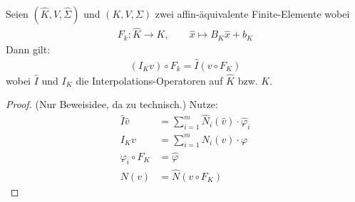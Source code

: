 \begin{lemma}\label{lemma4.13}
	Seien $(\hat{K},\hat{V},\hat{\Sigma})$ und $(K,V,\Sigma)$ zwei affin-äquivalente Finite-Elemente wobei
	\begin{align*}
		F_k:\hat{K}\to K,\qquad\hat{x}\mapsto B_K\hat{x}+b_K
	\end{align*}
	Dann gilt:
	\begin{align*}
		(I_K v)\circ F_k=\hat{I}(v\circ F_K)
	\end{align*}
	wobei $\hat{I}$ und $I_K$ die Interpolations-Operatoren auf $\hat{K}$ bzw. $K$.
\end{lemma}

\begin{proof}
	(Nur Beweisidee, da zu technisch.)
	Nutze:
	\begin{align*}
		\hat{I}\hat{v}&=\sum\limits_{i=1}^m\hat{N}_i(\hat{v})\cdot\hat{\varphi}_i\\
		I_K v&=\sum\limits_{i=1}^m N_i(v)\cdot\varphi\\
		\varphi_i\circ F_K&=\hat{\varphi}\\
		N(v)&=\hat{N}(v\circ F_K)
	\end{align*}
\end{proof}


